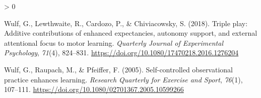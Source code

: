 \documentclass[
  english,
  jou]{apa7}
\newlength{\cslhangindent}
\newenvironment{CSLReferences}[2] %
 {%
  \setlength{\parindent}{0pt}
  \ifodd #1 \everypar{\setlength{\hangindent}{\cslhangindent}}\ignorespaces\fi
  \ifnum #2 > 0
  \setlength{\parskip}{#2\baselineskip}
  \fi
 }%
 {}
\begin{document}
\begin{CSLReferences}{1}{0}
\leavevmode\hypertarget{ref-wulf2018}{}%
Wulf, G., Lewthwaite, R., Cardozo, P., \& Chiviacowsky, S. (2018). Triple play: Additive contributions of enhanced expectancies, autonomy support, and external attentional focus to motor learning. \emph{Quarterly Journal of Experimental Psychology}, \emph{71}(4), 824--831. \url{https://doi.org/10.1080/17470218.2016.1276204}

\leavevmode\hypertarget{ref-wulf2005}{}%
Wulf, G., Raupach, M., \& Pfeiffer, F. (2005). Self-controlled observational practice enhances learning. \emph{Research Quarterly for Exercise and Sport}, \emph{76}(1), 107--111. \url{https://doi.org/10.1080/02701367.2005.10599266}

\end{CSLReferences}
\end{document}
